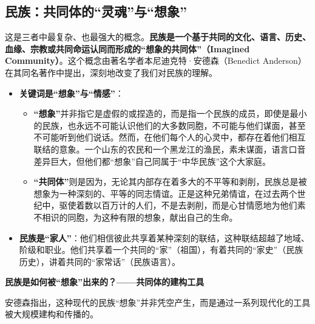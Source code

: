 \subsection{民族：共同体的“灵魂”与“想象”}

这是三者中最复杂、也最强大的概念。\textbf{民族是一个基于共同的文化、语言、历史、血缘、宗教或共同命运认同而形成的“想象的共同体”（Imagined Community）}。这个概念由著名学者本尼迪克特·安德森（Benedict Anderson）在其同名著作中提出，深刻地改变了我们对民族的理解。

\begin{itemize}[noitemsep,topsep=0pt]
    \item \textbf{关键词是“想象”与“情感”}：
    \begin{itemize}[noitemsep,topsep=0pt]
        \item \textbf{“想象”}并非指它是虚假的或捏造的，而是指一个民族的成员，即使是最小的民族，也永远不可能认识他们的大多数同胞，不可能与他们谋面，甚至不可能听到他们说话。然而，在他们每个人的心灵中，都存在着他们相互联结的意象。一个山东的农民和一个黑龙江的渔民，素未谋面，语言口音差异巨大，但他们都“想象”自己同属于“中华民族”这个大家庭。
        \item \textbf{“共同体”}则是因为，无论其内部存在着多大的不平等和剥削，民族总是被想象为一种深刻的、平等的同志情谊。正是这种兄弟情谊，在过去两个世纪中，驱使着数以百万计的人们，不是去剥削，而是心甘情愿地为他们素不相识的同胞，为这种有限的想象，献出自己的生命。
    \end{itemize}
    \item \textbf{民族是“家人”}：他们相信彼此共享着某种深刻的联结，这种联结超越了地域、阶级和职业。他们共享着一个共同的“家”（祖国），有着共同的“家史”（民族历史），讲着共同的“家常话”（民族语言）。
\end{itemize}

\textbf{民族是如何被“想象”出来的？——共同体的建构工具}

安德森指出，这种现代的民族“想象”并非凭空产生，而是通过一系列现代化的工具被大规模建构和传播的。

